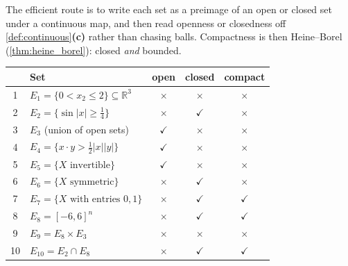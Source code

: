 \begin{exercisesolution}
\label{sol:open_closed_complete_compact}
The efficient route is to write each set as a preimage of an open or closed set under a
continuous map, and then read openness or closedness off \cref{def:continuous}\textbf{(c)}
rather than chasing balls. Compactness is then Heine--Borel (\cref{thm:heine_borel}): closed
\emph{and} bounded.
\begin{center}
\begin{tabular}{@{}c l c c c@{}}
& \textbf{Set} & \textbf{open} & \textbf{closed} & \textbf{compact} \\
\hline
1 & $E_1 = \{0 < x_2 \leq 2\} \subseteq \mathbb{R}^3$ & $\times$ & $\times$ & $\times$ \\
2 & $E_2 = \{\sin|x| \geq \tfrac14\}$ & $\times$ & $\checkmark$ & $\times$ \\
3 & $E_3$ (union of open sets) & $\checkmark$ & $\times$ & $\times$ \\
4 & $E_4 = \{x\cdot y > \tfrac12|x||y|\}$ & $\checkmark$ & $\times$ & $\times$ \\
5 & $E_5 = \{X \text{ invertible}\}$ & $\checkmark$ & $\times$ & $\times$ \\
6 & $E_6 = \{X \text{ symmetric}\}$ & $\times$ & $\checkmark$ & $\times$ \\
7 & $E_7 = \{X \text{ with entries } 0,1\}$ & $\times$ & $\checkmark$ & $\checkmark$ \\
8 & $E_8 = [-6,6]^n$ & $\times$ & $\checkmark$ & $\checkmark$ \\
9 & $E_9 = E_8 \times E_3$ & $\times$ & $\times$ & $\times$ \\
10 & $E_{10} = E_2 \cap E_8$ & $\times$ & $\checkmark$ & $\checkmark$ \\
\end{tabular}
\end{center}


\end{exercisesolution}
